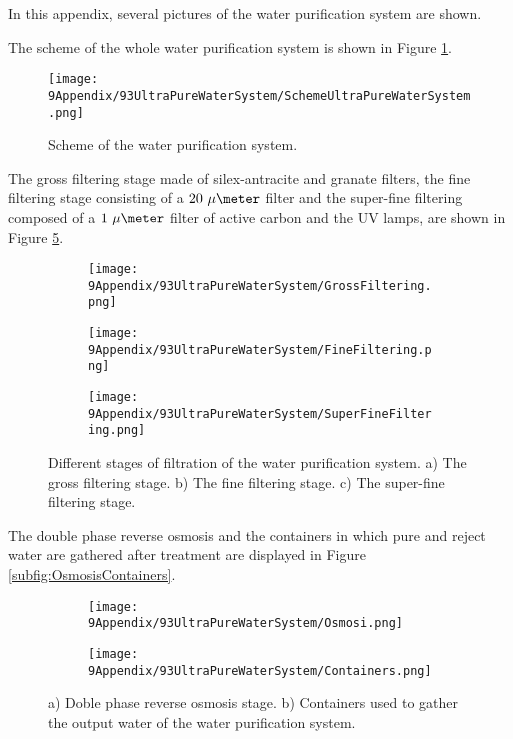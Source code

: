In this appendix, several pictures of the water purification system are shown. 

The scheme of the whole water purification system is shown in Figure \ref{fig:SchemeUPWS}.
\begin{figure}[htbp]
\centering
\texttt{[image: 9Appendix/93UltraPureWaterSystem/SchemeUltraPureWaterSystem.png]}
\caption{Scheme of the water purification system.\label{fig:SchemeUPWS}}
\end{figure}
The gross filtering stage made of silex-antracite and granate filters, the fine filtering stage consisting of a $20~\mu\meter$ filter and the super-fine filtering composed of a $1~\mu\meter$ filter of active carbon and the UV lamps, are shown in Figure \ref{fig:UltraPureWaterStages}.
\begin{figure}
\centering
    \begin{subfigure}[b]{0.3\textwidth}
    \centering
    \texttt{[image: 9Appendix/93UltraPureWaterSystem/GrossFiltering.png]}  
    \caption{\label{subfig:GrossFiltering}}
    \end{subfigure}
    \hfill
    \begin{subfigure}[b]{0.3\textwidth}
    \centering
    \texttt{[image: 9Appendix/93UltraPureWaterSystem/FineFiltering.png]}  
    \caption{\label{subfig:FineFiltering}}
    \end{subfigure}
    \hfill
    \begin{subfigure}[b]{0.3\textwidth}
    \centering
    \texttt{[image: 9Appendix/93UltraPureWaterSystem/SuperFineFiltering.png]}  
    \caption{\label{subfig:SuperFineFiltering}}
    \end{subfigure}
 \caption{Different stages of filtration of the water purification system. a) The gross filtering stage. b) The fine filtering stage. c) The super-fine filtering stage.}
 \label{fig:UltraPureWaterStages}
\end{figure}
The double phase reverse osmosis and the containers in which pure and reject water are gathered after treatment are displayed in Figure \ref{subfig:OsmosisContainers}.
\begin{figure}
\centering
    \begin{subfigure}[b]{0.5\textwidth}
    \centering
    \texttt{[image: 9Appendix/93UltraPureWaterSystem/Osmosi.png]}  
    \caption{\label{subfig:Osmosi}}
    \end{subfigure}
    \hfill
    \begin{subfigure}[b]{0.8\textwidth}
    \centering
    \texttt{[image: 9Appendix/93UltraPureWaterSystem/Containers.png]}  
    \caption{\label{subfig:Containers}}
    \end{subfigure}
 \caption{a) Doble phase reverse osmosis stage. b) Containers used to gather the output water of the water purification system.}
 \label{fig:OsmosisContainers}
\end{figure}
